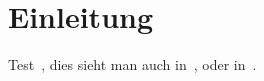\chapter{Einleitung}
Test~\citep{Xbook}, dies sieht man auch in~\citep[][S. 12]{Xbooklet}, oder in~\citep{Xconference}.
